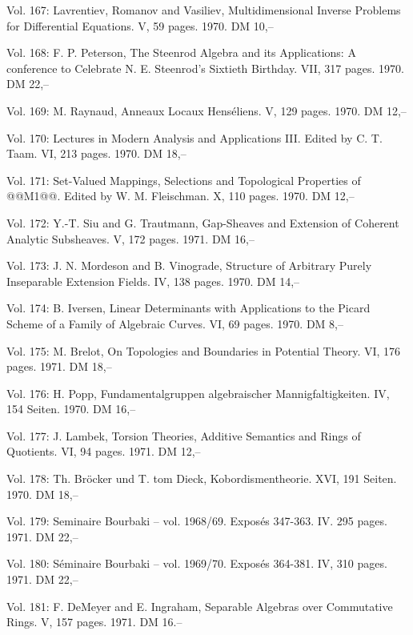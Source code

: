 Vol. 167: Lavrentiev, Romanov and Vasiliev, Multidimensional Inverse Problems for Differential Equations. V, 59 pages. 1970. DM 10,--

Vol. 168: F. P. Peterson, The Steenrod Algebra and its Applications: A conference to Celebrate N. E. Steenrod's Sixtieth Birthday. VII, 317 pages. 1970. DM 22,--

Vol. 169: M. Raynaud, Anneaux Locaux Henséliens. V, 129 pages. 1970. DM 12,--

Vol. 170: Lectures in Modern Analysis and Applications III. Edited by C. T. Taam. VI, 213 pages. 1970. DM 18,--

Vol. 171: Set-Valued Mappings, Selections and Topological Properties of @@M1@@. Edited by W. M. Fleischman. X, 110 pages. 1970. DM 12,--

Vol. 172: Y.-T. Siu and G. Trautmann, Gap-Sheaves and Extension of Coherent Analytic Subsheaves. V, 172 pages. 1971. DM 16,--

Vol. 173: J. N. Mordeson and B. Vinograde, Structure of Arbitrary Purely Inseparable Extension Fields. IV, 138 pages. 1970. DM 14,--

Vol. 174: B. Iversen, Linear Determinants with Applications to the Picard Scheme of a Family of Algebraic Curves. VI, 69 pages. 1970. DM 8,--

Vol. 175: M. Brelot, On Topologies and Boundaries in Potential Theory. VI, 176 pages. 1971. DM 18,--

Vol. 176: H. Popp, Fundamentalgruppen algebraischer Mannigfaltigkeiten. IV, 154 Seiten. 1970. DM 16,--

Vol. 177: J. Lambek, Torsion Theories, Additive Semantics and Rings of Quotients. VI, 94 pages. 1971. DM 12,--

Vol. 178: Th. Bröcker und T. tom Dieck, Kobordismentheorie. XVI, 191 Seiten. 1970. DM 18,--

Vol. 179: Seminaire Bourbaki -- vol. 1968/69. Exposés 347-363. IV. 295 pages. 1971. DM 22,--

Vol. 180: Séminaire Bourbaki -- vol. 1969/70. Exposés 364-381. IV, 310 pages. 1971. DM 22,--

Vol. 181: F. DeMeyer and E. Ingraham, Separable Algebras over Commutative Rings. V, 157 pages. 1971. DM 16.--

